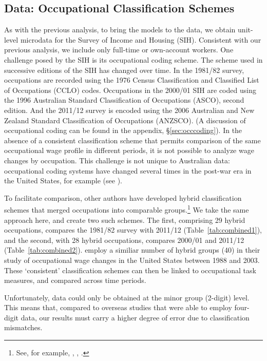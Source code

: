 \subsection{Data: Occupational Classification Schemes}

As with the previous analysis, to bring the models to the data, we obtain unit-level microdata for the Survey of Income and Housing (SIH). Consistent with our previous analysis, we include only full-time or own-account workers. One challenge posed by the SIH is its occupational coding scheme. The  scheme used in successive editions of the SIH has changed over time. In the 1981/82 survey, occupations are recorded using the 1976 Census Classification and Classified List of Occupations (CCLO) codes. Occupations in the 2000/01 SIH are coded using the 1996 Australian Standard Classification of Occupations (ASCO), second edition. And the 2011/12 survey is encoded using the 2006 Australian and New Zealand Standard Classification of Occupations (ANZSCO). (A discussion of occupational coding can be found in the appendix, \S\ref{sec:occcoding}). In the absence of a consistent classification scheme that permits comparison of the same occupational wage profile in different periods, it is not possible to analyze wage changes by occupation. This challenge is not unique to Australian data: occupational coding systems have changed several times in the post-war era in the United States, for example (see \cite{Autor2012,Meyer2005}).

To facilitate comparison, other authors have developed hybrid classification schemes that merged occupations into comparable groups.\footnote{See, for example, \citet{Levy2003}, \citet{Fortin2011}, \citet{Acemoglu2011}.} We take the same approach here, and create two such schemes. The first, comprising 29 hybrid occupations, compares the 1981/82 survey with 2011/12 (Table~\ref{tab:combined1}), and the second, with 28 hybrid occupations, compares 2000/01 and 2011/12 (Table~\ref{tab:combined2}). \citet{Firpo2011} employ a similiar number of hybrid groups (40) in their study of occupational wage changes in the United States between 1988 and 2003. These `consistent' classification schemes can then be linked to occupational task measures, and compared across time periods.

Unfortunately, data could only be obtained at the minor group (2-digit) level. This means that, compared to overseas studies that were able to employ four-digit data, our results must carry a higher degree of error due to classification mismatches.


